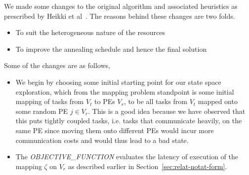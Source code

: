 We made some changes to the original algorithm and associated heuristics as
prescribed by Heikki et al~\cite{hors06}. The reasons behind these changes are two folds.
\begin{itemize}
\item To suit the heterogeneous nature of the resources
\item To improve the annealing schedule and hence the final solution
\end{itemize}

Some of the changes are as follows,

\begin{itemize}

\item We begin by choosing some initial starting point for our state space exploration, which from
the mapping problem standpoint is some initial mapping of tasks from $V_t$ to
PEs $V_r$, to be all tasks from $V_t$ mapped onto
some random PE $j \in V_r$. This is a good idea because we have observed that
this puts tightly coupled tasks, i.e. tasks that communicate heavily, on the
same PE since moving them onto different PEs would incur more communication
costs and would thus lead to a bad state.

\item The \textit{OBJECTIVE\_FUNCTION} evaluates the latency of execution of
the mapping $\zeta$ on $V_r$ as described earlier in
Section~\ref{sec:relat-notat-form}. 


\end{itemize}
